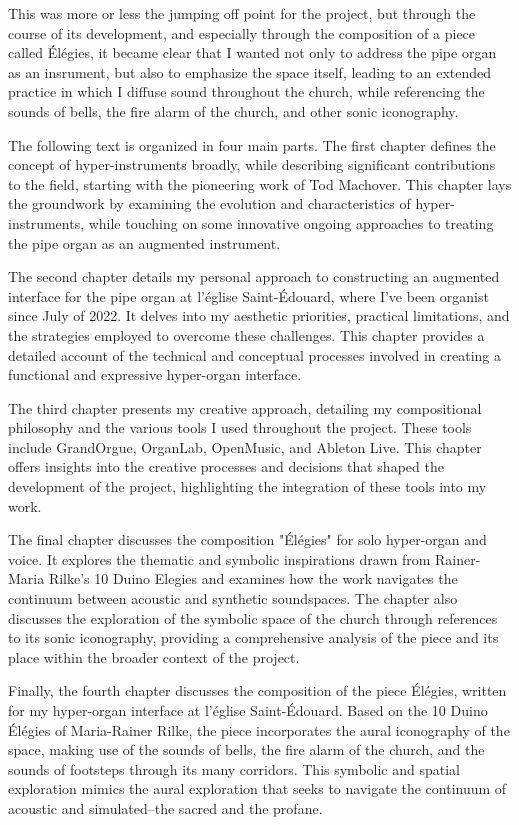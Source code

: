 \documentclass[12pt,twoside,maitrise]{dms_ks}
\theoremstyle{definition}
\begin{document}
This was more or less the jumping off point for the project, but through the course of its development, and especially through the composition of a piece called Élégies, it became clear that I wanted not only to address the pipe organ as an insrument, but also to emphasize the space itself, leading to an extended practice in which I diffuse sound throughout the church, while referencing the sounds of bells, the fire alarm of the church, and other sonic iconography. 

The following text is organized in four main parts. 
The first chapter defines the concept of hyper-instruments broadly, while describing significant contributions to the field, starting with the pioneering work of Tod Machover. 
This chapter lays the groundwork by examining the evolution and characteristics of hyper-instruments, while touching on some innovative ongoing approaches to treating the pipe organ as an augmented instrument.

The second chapter details my personal approach to constructing an augmented interface for the pipe organ at l’église Saint-Édouard, where I've been organist since July of 2022. 
It delves into my aesthetic priorities, practical limitations, and the strategies employed to overcome these challenges. 
This chapter provides a detailed account of the technical and conceptual processes involved in creating a functional and expressive hyper-organ interface.

The third chapter presents my creative approach, detailing my compositional philosophy and the various tools I used throughout the project. 
These tools include GrandOrgue, OrganLab, OpenMusic, and Ableton Live. 
This chapter offers insights into the creative processes and decisions that shaped the development of the project, highlighting the integration of these tools into my work.

The final chapter discusses the composition "Élégies" for solo hyper-organ and voice. 
It explores the thematic and symbolic inspirations drawn from Rainer-Maria Rilke's 10 Duino Elegies and examines how the work navigates the continuum between acoustic and synthetic soundspaces. 
The chapter also discusses the exploration of the symbolic space of the church through references to its sonic iconography, providing a comprehensive analysis of the piece and its place within the broader context of the project.

Finally, the fourth chapter discusses the composition of the piece Élégies, written for my hyper-organ interface at l’église Saint-Édouard. 
Based on the 10 Duino Élégies of Maria-Rainer Rilke, the piece incorporates the aural iconography of the space, making use of the sounds of bells, the fire alarm of the church, and the sounds of footsteps through its many corridors. 
This symbolic and spatial exploration mimics the aural exploration that seeks to navigate the continuum of acoustic and simulated--the sacred and the profane.
\end{document}
